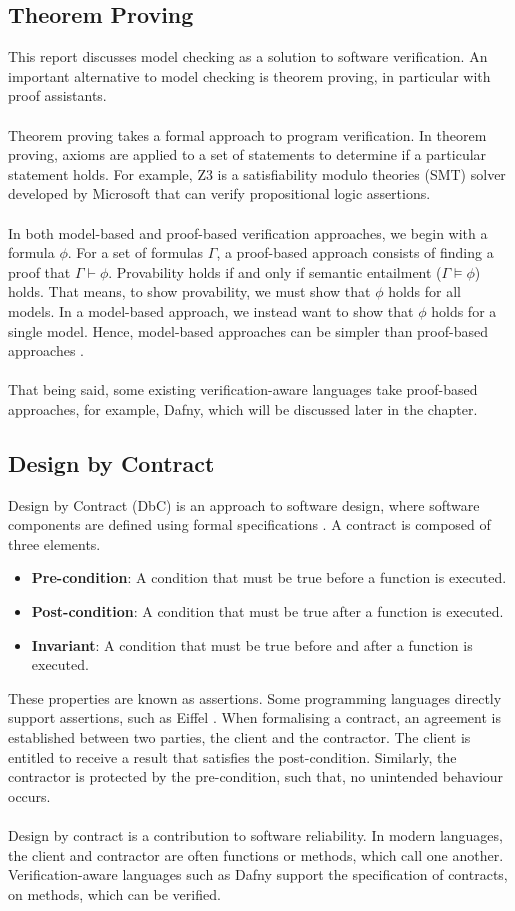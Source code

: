 \subsection{Theorem Proving}
This report discusses model checking as a solution to software verification. An important alternative to model checking is theorem proving, in particular with proof assistants.
\\ \\
Theorem proving takes a formal approach to program verification. In theorem proving, axioms are applied to a set of statements to determine if a particular statement holds. For example, Z3 \cite{z3} is a satisfiability modulo theories (SMT) solver developed by Microsoft that can verify propositional logic assertions.
\\ \\
In both model-based and proof-based verification approaches, we begin with a formula $\phi$. For a set of formulas $\Gamma$, a proof-based approach consists of finding a proof that $\Gamma \vdash \phi$. Provability holds if and only if semantic entailment ($\Gamma \models \phi$) holds. That means, to show provability, we must show that $\phi$ holds for all models. In a model-based approach, we instead want to show that $\phi$ holds for a single model. Hence, model-based approaches can be simpler than proof-based approaches \cite{logic_in_cs}.
\\ \\
That being said, some existing verification-aware languages take proof-based approaches, for example, Dafny, which will be discussed later in the chapter.
\subsection{Design by Contract}
Design by Contract (DbC) is an approach to software design, where software components are defined using formal specifications \cite{dbc}. A contract is composed of three elements.
\begin{itemize}
    \item \textbf{Pre-condition}: A condition that must be true before a function is executed.
    \item \textbf{Post-condition}: A condition that must be true after a function is executed.
    \item \textbf{Invariant}: A condition that must be true before and after a function is executed.
\end{itemize}
These properties are known as assertions. Some programming languages directly support assertions, such as Eiffel \cite{eiffel}. When formalising a contract, an agreement is established between two parties, the client and the contractor. The client is entitled to receive a result that satisfies the post-condition. Similarly, the contractor is protected by the pre-condition, such that, no unintended behaviour occurs.
\\ \\
Design by contract is a contribution to software reliability. In modern languages, the client and contractor are often functions or methods, which call one another. Verification-aware languages such as Dafny \cite{dafny_paper} support the specification of contracts, on methods, which can be verified.
